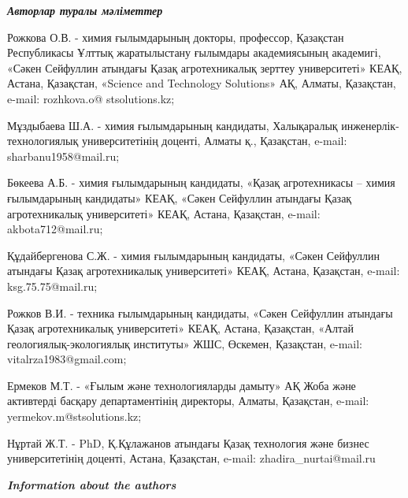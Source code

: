 \emph{{\bfseries Авторлар туралы мәліметтер}}

\begin{noparindent}
Рожкова О.В. - химия ғылымдарының докторы, профессор, Қазақстан
Республикасы Ұлттық жаратылыстану ғылымдары академиясының академигі,
«Сәкен Сейфуллин атындағы Қазақ агротехникалық зерттеу университеті»
КЕАҚ, Астана, Қазақстан, «Science and Technology Solutions» АҚ, Алматы,
Қазақстан, e-mail: rozhkova.o@ stsolutions.kz;

Мұздыбаева Ш.А. - химия ғылымдарының кандидаты, Халықаралық
инженерлік-технологиялық университетінің доценті, Алматы қ., Қазақстан,
e-mail: sharbanu1958@mail.ru;

Бөкеева А.Б. - химия ғылымдарының кандидаты, «Қазақ агротехникасы --
химия ғылымдарының кандидаты» КЕАҚ, «Сәкен Сейфуллин атындағы Қазақ
агротехникалық университеті» КЕАҚ, Астана, Қазақстан, e-mail:
akbota712@mail.ru;

Құдайбергенова С.Ж. - химия ғылымдарының кандидаты, «Сәкен Сейфуллин
атындағы Қазақ агротехникалық университеті» КЕАҚ, Астана, Қазақстан,
e-mail: ksg.75.75@mail.ru;

Рожков В.И. - техника ғылымдарының кандидаты, «Сәкен Сейфуллин атындағы
Қазақ агротехникалық университеті» КЕАҚ, Астана, Қазақстан, «Алтай
геологиялық-экологиялық институты» ЖШС, Өскемен, Қазақстан, e-mail:
vitalrza1983@gmail.com;

Ермеков М.Т. - «Ғылым және технологияларды дамыту» АҚ Жоба және
активтерді басқару департаментінің директоры, Алматы, Қазақстан, e-mail:
yermekov.m@stsolutions.kz;

Нұртай Ж.Т. - PhD, Қ.Құлажанов атындағы Қазақ технология және бизнес
университетінің доценті, Астана, Қазақстан, e-mail:
zhadira\_nurtai@mail.ru
\end{noparindent}

\emph{{\bfseries Information about the authors}}

